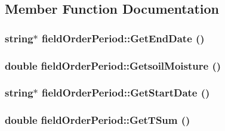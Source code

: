 \subsection{Member Function Documentation}
\hypertarget{classfield_order_period_a5f4352cf8028de7e8746d942c5139b90}{
\subsubsection[{GetEndDate}]{\setlength{\rightskip}{0pt plus 5cm}string$\ast$ fieldOrderPeriod::GetEndDate ()}}
\label{classfield_order_period_a5f4352cf8028de7e8746d942c5139b90}
\hypertarget{classfield_order_period_a794b8b4ad31e8f98d940a9be0056b690}{
\subsubsection[{GetsoilMoisture}]{\setlength{\rightskip}{0pt plus 5cm}double fieldOrderPeriod::GetsoilMoisture ()}}
\label{classfield_order_period_a794b8b4ad31e8f98d940a9be0056b690}
\hypertarget{classfield_order_period_aa6caf9c2f95ac68cccd1d5cac9ee73ae}{
\subsubsection[{GetStartDate}]{\setlength{\rightskip}{0pt plus 5cm}string$\ast$ fieldOrderPeriod::GetStartDate ()}}
\label{classfield_order_period_aa6caf9c2f95ac68cccd1d5cac9ee73ae}
\hypertarget{classfield_order_period_a588c0865c3672ebf99ab2b524c025d0e}{
\subsubsection[{GetTSum}]{\setlength{\rightskip}{0pt plus 5cm}double fieldOrderPeriod::GetTSum ()}}
